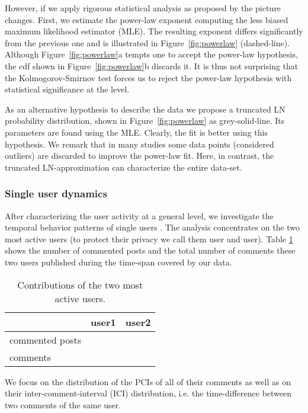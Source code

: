\documentclass[twoside,11pt]{article}
\begin{document}
However, if we apply rigorous statistical analysis as proposed by 
\citet{goldstein2004} the picture changes.  First,
we estimate the power-law exponent computing the less biased maximum
likelihood estimator (MLE).  The resulting exponent 
differs significantly from the previous one and is illustrated in
Figure~\ref{fig:powerlaw} (dashed-line).  Although
Figure~\ref{fig:powerlaw}a tempts one to accept the power-law
hypothesis, the cdf shown in Figure~\ref{fig:powerlaw}b discards it.
It is thus not surprising that the Kolmogorov-Smirnov test forces us
to reject the power-law hypothesis with statistical significance at
the  level.

As an alternative hypothesis to describe the data we propose a
truncated LN probability distribution, shown in
Figure~\ref{fig:powerlaw} as grey-solid-line. Its parameters are found
using the MLE.  Clearly, the fit is better using this hypothesis.  We
remark that in many studies some data points (considered outliers) are
discarded to improve the power-law fit.  Here, in contrast, the
truncated LN-approximation can characterize the entire data-set.

\subsubsection{Single user dynamics} \noindent 
After characterizing the user activity at a general level, we
investigate the temporal behavior patterns of single users . The
analysis concentrates on the two most active users (to protect their
privacy we call them user and user). Table \ref{table:active}
shows the number of commented posts and the total number of comments
these two users published during the time-span covered by our data.
\vspace{-12pt}
\begin{table}[!hb]\centering
\caption{Contributions of the two most active users.}
\begin{tabular}{lrr} 
& user1                     & user2\\
\hline 
commented posts &  &  \\
comments        &  &  
\end{tabular}
\label{table:active}
\end{table}

\noindent
We focus on the distribution of the PCIs of all of their comments as
well as on their inter-comment-interval (ICI) distribution, i.e.  the
time-difference between two comments of the same user.
\end{document}
